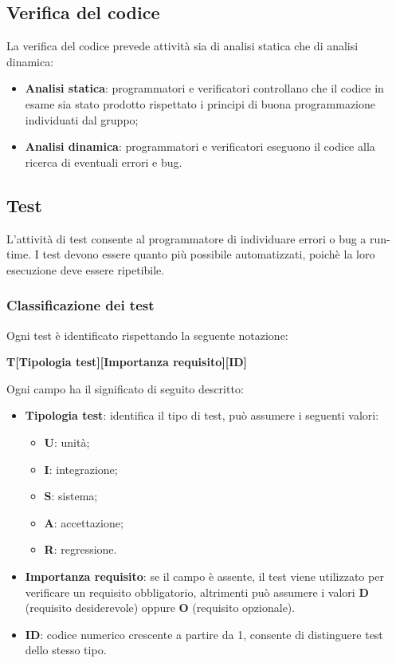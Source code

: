 \documentclass{article}
\begin{document}
\subsection{Verifica del codice}
La verifica del codice prevede attività sia di analisi statica che di analisi dinamica:
\begin{itemize}
    \item \textbf{Analisi statica}: programmatori e verificatori controllano che il codice in esame sia stato prodotto rispettato i principi di buona programmazione individuati dal gruppo;
    \item \textbf{Analisi dinamica}: programmatori e verificatori eseguono il codice alla ricerca di eventuali errori e bug.
\end{itemize}
\subsection{Test}
L'attività di test consente al programmatore di individuare errori o bug a run-time. I test devono essere quanto più possibile automatizzati, poichè la loro esecuzione deve essere ripetibile.
\subsubsection{Classificazione dei test}
Ogni test è identificato rispettando la seguente notazione:
\begin{center}
    \textbf{T[Tipologia test][Importanza requisito][ID]}
\end{center}
Ogni campo ha il significato di seguito descritto:
\begin{itemize}
    \item \textbf{Tipologia test}: identifica il tipo di test, può assumere i seguenti valori: 
        \begin{itemize}
            \item \textbf{U}: unità;
            \item \textbf{I}: integrazione;
            \item \textbf{S}: sistema;
            \item \textbf{A}: accettazione;
            \item \textbf{R}: regressione.
        \end{itemize}
    \item \textbf{Importanza requisito}: se il campo è assente, il test viene utilizzato per verificare un requisito obbligatorio, altrimenti può assumere i valori \textbf{D} (requisito desiderevole) oppure \textbf{O} (requisito opzionale).
    \item \textbf{ID}: codice numerico crescente a partire da 1, consente di distinguere test dello stesso tipo.
\end{itemize}
\end{document}
